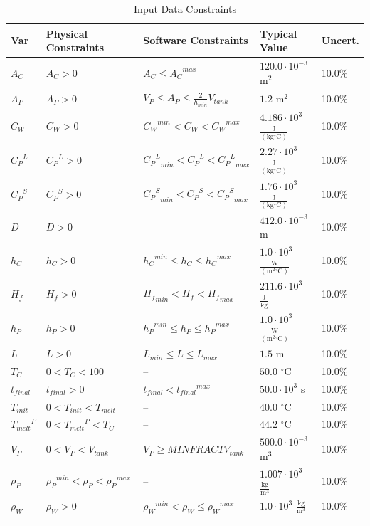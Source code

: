 \documentclass[12pt]{article}
\begin{document}
\begin{longtable}{l l l l l}
\toprule
Var & Physical Constraints & Software Constraints & Typical Value & Uncert.
\\
\midrule
${A_{C}}$ & ${A_{C}}>0$ & ${A_{C}}\leq{}{{A_{C}}^{max}}$ & $120.0\cdot{}10^{-3}$ $\text{m}^{2}$ & 10.0$\%$
\\
${A_{P}}$ & ${A_{P}}>0$ & ${V_{P}}\leq{}{A_{P}}\leq{}\frac{2}{{h_{min}}} {V_{tank}}$ & $1.2$ $\text{m}^{2}$ & 10.0$\%$
\\
${C_{W}}$ & ${C_{W}}>0$ & ${{C_{W}}^{min}}<{C_{W}}<{{C_{W}}^{max}}$ & $4.186\cdot{}10^{3}$ $\frac{\text{J}}{(\text{kg}{}^{\circ}\text{C})}$ & 10.0$\%$
\\
${{C_{P}}^{L}}$ & ${{C_{P}}^{L}}>0$ & ${{{C_{P}}^{L}}_{min}}<{{C_{P}}^{L}}<{{{C_{P}}^{L}}_{max}}$ & $2.27\cdot{}10^{3}$ $\frac{\text{J}}{(\text{kg}{}^{\circ}\text{C})}$ & 10.0$\%$
\\
${{C_{P}}^{S}}$ & ${{C_{P}}^{S}}>0$ & ${{{C_{P}}^{S}}_{min}}<{{C_{P}}^{S}}<{{{C_{P}}^{S}}_{max}}$ & $1.76\cdot{}10^{3}$ $\frac{\text{J}}{(\text{kg}{}^{\circ}\text{C})}$ & 10.0$\%$
\\
$D$ & $D>0$ & -- & $412.0\cdot{}10^{-3}$ m & 10.0$\%$
\\
${h_{C}}$ & ${h_{C}}>0$ & ${{h_{C}}^{min}}\leq{}{h_{C}}\leq{}{{h_{C}}^{max}}$ & $1.0\cdot{}10^{3}$ $\frac{\text{W}}{(\text{m}^{2}{}^{\circ}\text{C})}$ & 10.0$\%$
\\
${H_{f}}$ & ${H_{f}}>0$ & ${{H_{f}}_{min}}<{H_{f}}<{{H_{f}}_{max}}$ & $211.6\cdot{}10^{3}$ $\frac{\text{J}}{\text{kg}}$ & 10.0$\%$
\\
${h_{P}}$ & ${h_{P}}>0$ & ${{h_{P}}^{min}}\leq{}{h_{P}}\leq{}{{h_{P}}^{max}}$ & $1.0\cdot{}10^{3}$ $\frac{\text{W}}{(\text{m}^{2}{}^{\circ}\text{C})}$ & 10.0$\%$
\\
$L$ & $L>0$ & ${L_{min}}\leq{}L\leq{}{L_{max}}$ & $1.5$ m & 10.0$\%$
\\
${T_{C}}$ & $0<{T_{C}}<100$ & -- & $50.0$ ${}^{\circ}$C & 10.0$\%$
\\
${t_{final}}$ & ${t_{final}}>0$ & ${t_{final}}<{{t_{final}}^{max}}$ & $50.0\cdot{}10^{3}$ s & 10.0$\%$
\\
${T_{init}}$ & $0<{T_{init}}<{T_{melt}}$ & -- & $40.0$ ${}^{\circ}$C & 10.0$\%$
\\
${{T_{melt}}^{P}}$ & $0<{{T_{melt}}^{P}}<{T_{C}}$ & -- & $44.2$ ${}^{\circ}$C & 10.0$\%$
\\
${V_{P}}$ & $0<{V_{P}}<{V_{tank}}$ & ${V_{P}}\geq{}MINFRACT {V_{tank}}$ & $500.0\cdot{}10^{-3}$ $\text{m}^{3}$ & 10.0$\%$
\\
${ρ_{P}}$ & ${{ρ_{P}}^{min}}<{ρ_{P}}<{{ρ_{P}}^{max}}$ & -- & $1.007\cdot{}10^{3}$ $\frac{\text{kg}}{\text{m}^{3}}$ & 10.0$\%$
\\
${ρ_{W}}$ & ${ρ_{W}}>0$ & ${{ρ_{W}}^{min}}<{ρ_{W}}\leq{}{{ρ_{W}}^{max}}$ & $1.0\cdot{}10^{3}$ $\frac{\text{kg}}{\text{m}^{3}}$ & 10.0$\%$
\\
\bottomrule
\caption{Input Data Constraints}
\label{Table:InDataConstraints}
\end{longtable}
\end{document}
